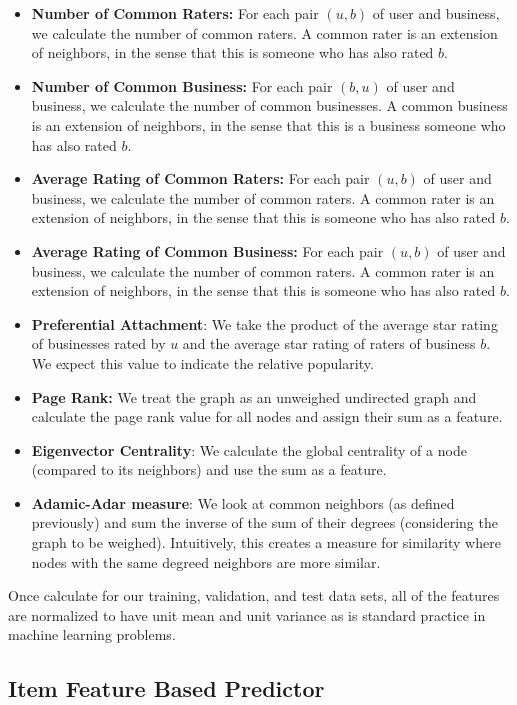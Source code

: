 \documentclass[letterpaper, 10 pt, conference]{ieeeconf}  %
\begin{document}
\begin{itemize}
\item \textbf{Number of Common Raters:} For each pair $(u,b)$ of user and business, we calculate the number of common raters. A common rater is an extension of neighbors, in the sense that this is someone who has also rated $b$.
\item \textbf{Number of Common Business:} For each pair $(b,u)$ of user and business, we calculate the number of common businesses. A common business is an extension of neighbors, in the sense that this is a business someone who has also rated $b$.
\item \textbf{Average Rating of Common Raters:} For each pair $(u,b)$ of user and business, we calculate the number of common raters. A common rater is an extension of neighbors, in the sense that this is someone who has also rated $b$.
\item \textbf{Average Rating of Common Business:} For each pair $(u,b)$ of user and business, we calculate the number of common raters. A common rater is an extension of neighbors, in the sense that this is someone who has also rated $b$.
\item \textbf{Preferential Attachment}: We take the product of the average star rating of businesses rated by $u$ and the average star rating of raters of business $b$. We expect this value to indicate the relative popularity.
\item \textbf{Page Rank:} We treat the graph as an unweighed undirected graph and calculate the page rank value for all nodes and assign their sum as a feature.
\item \textbf{Eigenvector Centrality}: We calculate the global centrality of a node (compared to its neighbors) and use the sum as a feature.
\item \textbf{Adamic-Adar measure}: We look at common neighbors (as defined previously) and sum the inverse of the sum of their degrees (considering the graph to be weighed). Intuitively, this creates a measure for similarity where nodes with the same degreed neighbors are more similar.
\end{itemize}


Once calculate for our training, validation, and test data sets, all of the features are normalized to have unit mean and unit variance as is standard practice in machine learning problems.
  

\subsection{Item Feature Based Predictor}
\end{document}
